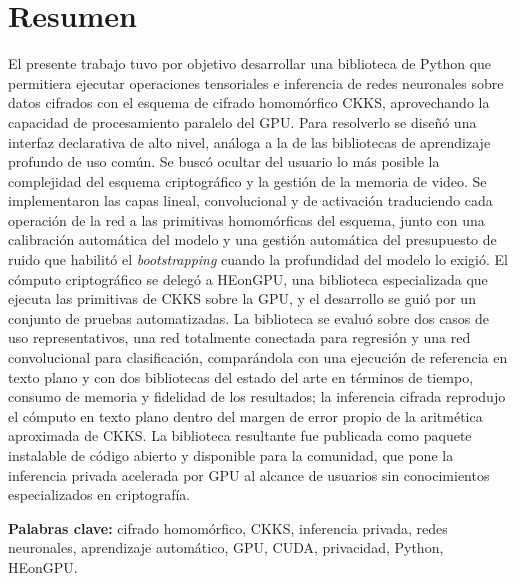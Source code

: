 \chapter*{Resumen}

El presente trabajo tuvo por objetivo desarrollar una biblioteca de Python que permitiera ejecutar operaciones tensoriales e inferencia de redes neuronales sobre datos cifrados con el esquema de cifrado homomórfico CKKS, aprovechando la capacidad de procesamiento paralelo del GPU. Para resolverlo se diseñó una interfaz declarativa de alto nivel, análoga a la de las bibliotecas de aprendizaje profundo de uso común. Se buscó ocultar del usuario lo más posible la complejidad del esquema criptográfico y la gestión de la memoria de video. Se implementaron las capas lineal, convolucional y de activación traduciendo cada operación de la red a las primitivas homomórficas del esquema, junto con una calibración automática del modelo y una gestión automática del presupuesto de ruido que habilitó el \textit{bootstrapping} cuando la profundidad del modelo lo exigió. El cómputo criptográfico se delegó a HEonGPU, una biblioteca especializada que ejecuta las primitivas de CKKS sobre la GPU, y el desarrollo se guió por un conjunto de pruebas automatizadas. La biblioteca se evaluó sobre dos casos de uso representativos, una red totalmente conectada para regresión y una red convolucional para clasificación, comparándola con una ejecución de referencia en texto plano y con dos bibliotecas del estado del arte en términos de tiempo, consumo de memoria y fidelidad de los resultados; la inferencia cifrada reprodujo el cómputo en texto plano dentro del margen de error propio de la aritmética aproximada de CKKS. La biblioteca resultante fue publicada como paquete instalable de código abierto y disponible para la comunidad, que pone la inferencia privada acelerada por GPU al alcance de usuarios sin conocimientos especializados en criptografía.

\vspace{2em}

\noindent\textbf{Palabras clave:} cifrado homomórfico, CKKS, inferencia privada, redes neuronales, aprendizaje automático, GPU, CUDA, privacidad, Python, HEonGPU.
